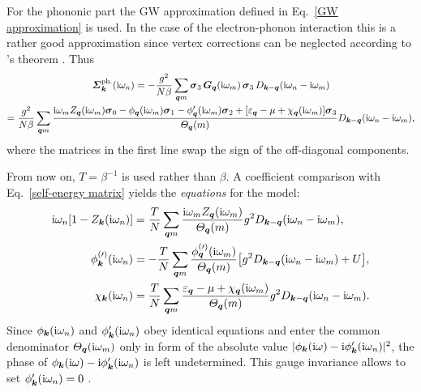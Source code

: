 For the phononic part the GW approximation defined in Eq.~\ref{GW approximation}
is used. In the case of the electron-phonon interaction this is a rather good
approximation since vertex corrections can be neglected according to
's theorem \cite{Migdal58}. Thus
%
\begin{multline*}
    \boldsymbol {\varSigma}_{\boldsymbol k} \sp{\text{ph.}} (\mathrm i \omega_n)
    = -\frac{g^2}{N \beta} \sum_{\boldsymbol q m}
    \boldsymbol \sigma_3 \, \boldsymbol G_{\boldsymbol q}(\mathrm i \omega_m) \, \boldsymbol \sigma_3 \,
    D_{\boldsymbol k - \boldsymbol q}(\mathrm i \omega_n - \mathrm i \omega_m)
    \\
    = \frac{g^2}{N \beta} \sum_{\boldsymbol q m}
    \frac { \mathrm i \omega_m
              Z_{\boldsymbol q}(\mathrm i \omega_m) \boldsymbol \sigma_0
        - \phi _{\boldsymbol q}(\mathrm i \omega_m) \boldsymbol \sigma_1
        - \phi'_{\boldsymbol q}(\mathrm i \omega_m) \boldsymbol \sigma_2
        + [\varepsilon_{\boldsymbol q} - \mu + \chi_{\boldsymbol q}(\mathrm i \omega_m)] \boldsymbol \sigma_3 }
        {\varTheta_{\boldsymbol q}(m)}
    D_{\boldsymbol k - \boldsymbol q}(\mathrm i \omega_n - \mathrm i \omega_m),
\end{multline*}
%
where the  matrices in the first line swap the sign of the
off-diagonal components.

From now on, $T = \beta^{-1}$ is used rather than $\beta$. A coefficient
comparison with Eq.~\ref{self-energy matrix} yields the \emph{
equations} \cite{Eliashberg60} for the  model:
%
\begin{subequations}
    \begin{align}
        \mathrm i \omega_n [1 - Z_{\boldsymbol k}(\mathrm i \omega_n)] &= \frac T N
        \sum_{\boldsymbol q m} \frac
            {\mathrm i \omega_m Z_{\boldsymbol q}(\mathrm i \omega_m)}
            {\varTheta_{\boldsymbol q}(m)}
        g^2 D_{\boldsymbol k - \boldsymbol q}(\mathrm i \omega_n - \mathrm i \omega_m),
        \\
        \phi^{(\prime)}_{\boldsymbol k}(\mathrm i \omega_n) &= -\frac T N
        \sum_{\boldsymbol q m} \frac
            {\phi^{(\prime)}_{\boldsymbol q}(\mathrm i \omega_m)}
            {\varTheta_{\boldsymbol q}(m)}
        \big[ g^2 D_{\boldsymbol k - \boldsymbol q}(\mathrm i \omega_n - \mathrm i \omega_m) + U \big],
        \\
        \chi_{\boldsymbol k}(\mathrm i \omega_n) &= \frac T N
        \sum_{\boldsymbol q m} \frac
            {\varepsilon_{\boldsymbol q} - \mu + \chi_{\boldsymbol q}(\mathrm i \omega_m)}
            {\varTheta_{\boldsymbol q}(m)}
        g^2 D_{\boldsymbol k - \boldsymbol q}(\mathrm i \omega_n - \mathrm i \omega_m).
    \end{align}
\end{subequations}
%
Since $\phi_{\boldsymbol k}(\mathrm i \omega_n)$ and $\phi'_{\boldsymbol k}(\mathrm i \omega_n)$ obey
identical equations and enter the common denominator $\varTheta_{\boldsymbol q}(\mathrm i
\omega_m)$ only in form of the absolute value $|\phi_{\boldsymbol k}(\mathrm i \omega) - \mathrm i
\phi'_{\boldsymbol k}(\mathrm i \omega_n)|^2$, the phase of $\phi_{\boldsymbol k}(\mathrm i \omega) - \mathrm i
\phi'_{\boldsymbol k}(\mathrm i \omega_n)$ is left undetermined. This gauge invariance allows
to set $\phi'_{\boldsymbol k}(\mathrm i \omega_n) = 0$ \cites[37]{AllenMitrovic82}[around
Eq.~2.20]{Nambu60}.

